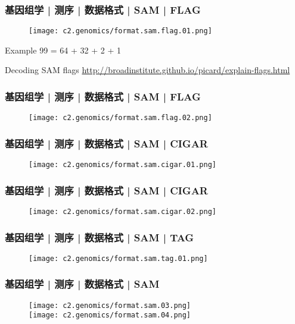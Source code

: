 \begin{frame}
  \frametitle{基因组学 | 测序 | 数据格式 | SAM | FLAG}
  \begin{figure}
    \centering
    \texttt{[image: c2.genomics/format.sam.flag.01.png]}
  \end{figure}
  \begin{block}{Example}
    99 = 64 + 32 + 2 + 1
  \end{block}
  \begin{block}{Decoding SAM flags}
  \href{http://broadinstitute.github.io/picard/explain-flags.html}{http://broadinstitute.github.io/picard/explain-flags.html}
  \end{block}
\end{frame}

\begin{frame}
  \frametitle{基因组学 | 测序 | 数据格式 | SAM | FLAG}
  \begin{figure}
    \centering
    \texttt{[image: c2.genomics/format.sam.flag.02.png]}
  \end{figure}
\end{frame}

\begin{frame}
  \frametitle{基因组学 | 测序 | 数据格式 | SAM | CIGAR}
  \begin{figure}
    \centering
    \texttt{[image: c2.genomics/format.sam.cigar.01.png]}
  \end{figure}
\end{frame}

\begin{frame}
  \frametitle{基因组学 | 测序 | 数据格式 | SAM | CIGAR}
  \begin{figure}
    \centering
    \texttt{[image: c2.genomics/format.sam.cigar.02.png]}
  \end{figure}
\end{frame}

\begin{frame}
  \frametitle{基因组学 | 测序 | 数据格式 | SAM | TAG}
  \begin{figure}
    \centering
    \texttt{[image: c2.genomics/format.sam.tag.01.png]}
  \end{figure}
\end{frame}

\begin{frame}
  \frametitle{基因组学 | 测序 | 数据格式 | SAM}
  \begin{figure}
    \centering
    \texttt{[image: c2.genomics/format.sam.03.png]}\\
    \vspace{1em}
    \texttt{[image: c2.genomics/format.sam.04.png]}
  \end{figure}
\end{frame}
    
